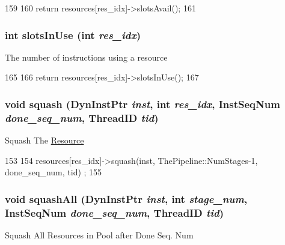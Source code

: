 \begin{DoxyCode}
159 {
160     return resources[res_idx]->slotsAvail();
161 }
\end{DoxyCode}
\hypertarget{classResourcePool_ac30878605317c199fc4371360bce7e0c}{
\subsubsection[{slotsInUse}]{\setlength{\rightskip}{0pt plus 5cm}int slotsInUse (int {\em res\_\-idx})}}
\label{classResourcePool_ac30878605317c199fc4371360bce7e0c}
The number of instructions using a resource 


\begin{DoxyCode}
165 {
166     return resources[res_idx]->slotsInUse();
167 }
\end{DoxyCode}
\hypertarget{classResourcePool_a1e6b072b1524df996c37c65f032c0c5e}{
\subsubsection[{squash}]{\setlength{\rightskip}{0pt plus 5cm}void squash ({\bf DynInstPtr} {\em inst}, \/  int {\em res\_\-idx}, \/  {\bf InstSeqNum} {\em done\_\-seq\_\-num}, \/  {\bf ThreadID} {\em tid})}}
\label{classResourcePool_a1e6b072b1524df996c37c65f032c0c5e}
Squash The \hyperlink{classResource}{Resource} 


\begin{DoxyCode}
153 {
154     resources[res_idx]->squash(inst, ThePipeline::NumStages-1, done_seq_num, tid)
      ;
155 }
\end{DoxyCode}
\hypertarget{classResourcePool_a58b8c9f76e422935e05267f75493d722}{
\subsubsection[{squashAll}]{\setlength{\rightskip}{0pt plus 5cm}void squashAll ({\bf DynInstPtr} {\em inst}, \/  int {\em stage\_\-num}, \/  {\bf InstSeqNum} {\em done\_\-seq\_\-num}, \/  {\bf ThreadID} {\em tid})}}
\label{classResourcePool_a58b8c9f76e422935e05267f75493d722}
Squash All Resources in Pool after Done Seq. Num 


